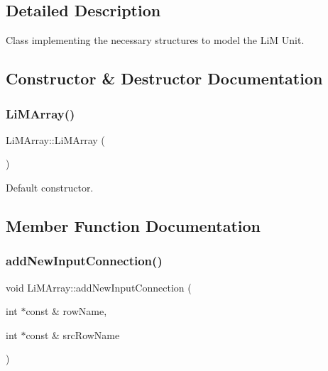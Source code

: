 \subsection{Detailed Description}
Class implementing the necessary structures to model the LiM Unit. 

\subsection{Constructor \& Destructor Documentation}
\mbox{\label{classoctantis_1_1LiMArray_a135b6437641126fff154d8d779232387}} 
\subsubsection{\texorpdfstring{Li\+M\+Array()}{LiMArray()}}
{\footnotesize\ttfamily Li\+M\+Array\+::\+Li\+M\+Array (\begin{DoxyParamCaption}{ }\end{DoxyParamCaption})}



Default constructor. 



\subsection{Member Function Documentation}
\mbox{\label{classoctantis_1_1LiMArray_a9732e49054f17cb15d68729c26b3fc21}} 
\subsubsection{\texorpdfstring{add\+New\+Input\+Connection()}{addNewInputConnection()}}
{\footnotesize\ttfamily void Li\+M\+Array\+::add\+New\+Input\+Connection (\begin{DoxyParamCaption}\item[{int $\ast$const \&}]{row\+Name,  }\item[{int $\ast$const \&}]{src\+Row\+Name }\end{DoxyParamCaption})}



